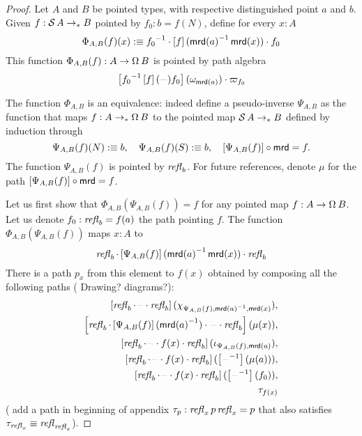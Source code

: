 \documentclass[english,a4]{article}
\renewcommand{\ap}[1]{\left[{#1}\right]}
\newcommand{\ptdto}{\to_\ast}%
\begin{document}
\begin{proof}
  Let $A$ and $B$ be pointed types, with respective distinguished point $a$ and
  $b$. Given $f:\susp A \ptdto B$ pointed by $f_0:b = f(N)$, define for every
  $x:A$
  \begin{displaymath}
    \Phi_{A,B}(f) (x) \defequi \inv{f_0} \cdot \ap f (\inv{\mrd(a)}\mrd(x)) \cdot f_0
  \end{displaymath}
  This function $\Phi_{A,B}(f): A \to \loopspace\null B$ is pointed by path algebra
  \begin{displaymath}
    \ap{\inv{f_0} \ap f(\blank) f_0 }(\omega_{\mrd(a)}) \cdot \varpi_{f_0} 
  \end{displaymath}
  
  The function $\Phi_{A,B}$ is an equivalence: indeed define a pseudo-inverse
  $\Psi_{A,B}$ as the function that maps $f: A\ptdto \loopspace\null B$ to the
  pointed map $\susp A \ptdto B$ defined by induction through 
  \begin{displaymath}
    \Psi_{A,B}(f)(N) \defequi b,\quad \Psi_{A,B}(f)(S) \defequi b,\quad
    \ap{\Psi_{A,B}(f)}\circ\mrd = f.
  \end{displaymath}
  The function $\Psi_{A,B}(f)$ is pointed by $\mathop{{\mathit{refl}}_{b}}$. For future references,
  denote $\mu$ for the path $\ap{\Psi_{A,B}(f)}\circ \mrd = f$.
  
  Let us first show that $\Phi_{A,B}(\Psi_{A,B}(f)) = f$ for any pointed map $f:A\to
  \loopspace\null B$. Let us denote $f_0: \mathop{{\mathit{refl}}_{b}} = f(a)$ the path pointing
  $f$. The function $\Phi_{A,B}(\Psi_{A,B}(f))$ maps $x:A$ to 
  \begin{displaymath}
    \refl b\cdot \ap{\Psi_{A,B}(f)}(\inv{\mrd(a)}\mrd(x))\cdot \refl b
  \end{displaymath}
  There is a path $p_x$ from this element to $f(x)$ obtained by composing all the
  following paths ({\color{red} Drawing? diagrams?}):
  \begin{align*}
    \ap{\refl b \cdot \blank \cdot \refl b}(\chi_{\Psi_{A,B}(f),\inv{\mrd(a)},\mrd(x)}),
    \\
    \ap{\refl b \cdot \ap{\Psi_{A,B}(f)}(\inv{\mrd(a)}) \cdot \blank \cdot \refl b}(\mu(x)),
    \\
    \ap{\refl b \cdot \blank \cdot f(x) \cdot \refl b}(\iota_{\Psi_{A,B}(f),\mrd(a)}),
    \\
    \ap{\refl b \cdot \blank \cdot f(x) \cdot \refl b}(\ap{\inv\blank}(\mu(a))),
    \\
    \ap{\refl b \cdot \blank \cdot f(x) \cdot \refl b}(\ap{\inv\blank}(f_0)),
    \\
    \tau_{f(x)}
  \end{align*}
  ({\color{red} add a path in beginning of appendix $\tau_p: \mathop{{\mathit{refl}}_{x}} p \mathop{{\mathit{refl}}_{x}}
  = p$ that also satisfies $\tau_{\mathop{{\mathit{refl}}_{x}}} \equiv \mathop{{\mathit{refl}}_{\mathop{{\mathit{refl}}_{x}}}}$}).


\end{proof}
\end{document}
